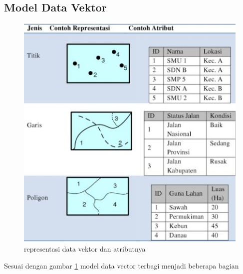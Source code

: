 \subsection{Model Data Vektor}
\begin{figure}[ht]
\centerline{\includegraphics[width=1\textwidth] {figures/vektor03.JPG}}
\caption{representasi data vektor dan atributnya}
\label{vektor03}
\end{figure}
Sesuai dengan gambar \ref{vektor03} model data vector terbagi menjadi beberapa bagian
